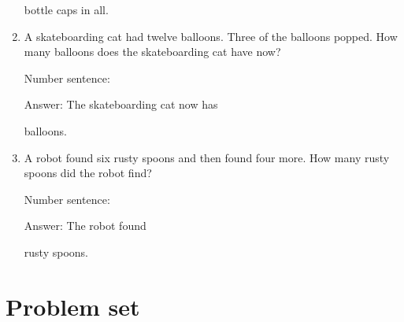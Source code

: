 \documentclass{tufte-book}
\begin{document}
\begin{enumerate}
  bottle caps in all.
\item
  A skateboarding cat had twelve balloons. Three of the balloons popped.
  How many balloons does the skateboarding cat have now?\medskip\par
  Number sentence:
  \dotfill\medskip\par
  Answer: The skateboarding cat now has
  \dotfill\medskip\par\mbox{}\dotfill\medskip\par\mbox{}\dotfill\bigskip
  balloons.
\item
  A robot found six rusty spoons and then found four more. How many
  rusty spoons did the robot find?\medskip\par
  Number sentence:
  \dotfill\medskip\par
  Answer: The robot found
  \dotfill\medskip\par\mbox{}\dotfill\medskip\par\mbox{}\dotfill\bigskip
  rusty spoons.
\end{enumerate}



\clearpage\section{Problem set }
\end{document}
